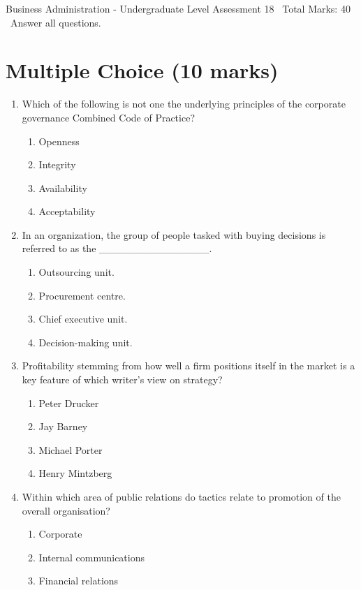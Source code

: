 \documentclass[12pt]{article}
\begin{document}
\begin{center}
Business Administration - Undergraduate Level Assessment 18 \
Total Marks: 40 \
Answer all questions.
\end{center}

\section*{Multiple Choice (10 marks)}
\begin{enumerate}[label=\arabic*.]
\item Which of the following is not one the underlying principles of the corporate governance Combined Code of Practice?
\begin{enumerate}[label=(\alph*)]
    \item Openness
    \item Integrity
    \item Availability
    \item Acceptability
\end{enumerate}
\item In an organization, the group of people tasked with buying decisions is referred to as the \_\_\_\_\_\_\_\_\_\_\_\_\_\_\_.
\begin{enumerate}[label=(\alph*)]
    \item Outsourcing unit.
    \item Procurement centre.
    \item Chief executive unit.
    \item Decision-making unit.
\end{enumerate}
\item Profitability stemming from how well a firm positions itself in the market is a key feature of which writer's view on strategy?
\begin{enumerate}[label=(\alph*)]
    \item Peter Drucker
    \item Jay Barney
    \item Michael Porter
    \item Henry Mintzberg
\end{enumerate}
\item Within which area of public relations do tactics relate to promotion of the overall organisation?
\begin{enumerate}[label=(\alph*)]
    \item Corporate
    \item Internal communications
    \item Financial relations

\end{enumerate}
\end{enumerate}
\end{document}
